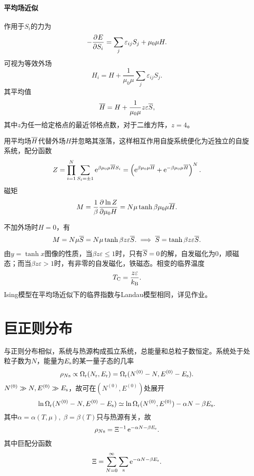 \paragraph{平均场近似}作用于$S_i$的力为 
\[
	-\frac{\partial^{{}}E}{\partial{S_i}^{{}}}=\sum_j\varepsilon_{ij}S_j+\mu_0\mu H.
\]
可视为等效外场
\[
	H_i=H+\frac1{\mu_0\mu}\sum_j\varepsilon_{ij}S_j.
\]
其平均值
\[
	\overline{H}=H+\frac1{\mu_0\mu}z\varepsilon\overline{S},
\]
其中$z$为任一给定格点的最近邻格点数，对于二维方阵，$z=4$。

用平均场$\overline{H}$代替外场$H$并忽略其涨落，这样相互作用自旋系统便化为近独立的自旋系统，配分函数
\[
	Z=\prod_{i=1}^N\sum_{S_i=\pm 1}\mathop{}\!\mathrm{e}^{\beta\mu_0\mu\overline{H} S_i}=\left(\mathop{}\!\mathrm{e}^{\beta\mu_0\mu\overline{H}}+\mathop{}\!\mathrm{e}^{-\beta\mu_0\mu\overline{H}}\right)^N.
\]
磁矩
\begin{align}
	M=\frac1\beta\frac{\partial^{{}}\ln Z}{\partial{\mu_0 H}^{{}}}=N\mu\tanh\beta\mu_0\mu\overline{H}.
\end{align}

不加外场时$H=0$，有
\begin{align}
	M=N\mu\overline{S}=N\mu\tanh\beta z\varepsilon\overline{S}.\implies\overline{S}=\tanh\beta z\varepsilon\overline{S}.
\end{align}
由$y=\tanh x$图像的性质，当$\beta z\varepsilon\leqslant 1$时，只有$\overline{S}=0$的解，自发磁化为0，顺磁态；而当$\beta z\varepsilon>1$时，有非零的自发磁化，铁磁态。相变的临界温度
\begin{align}
	T_\mathrm C=\frac{z\varepsilon}{k_{\mathrm B}}.
\end{align}
Ising模型在平均场近似下的临界指数与Landau模型相同，详见作业。
\section{巨正则分布}

与正则分布相似，系统与热源构成孤立系统，总能量和总粒子数恒定。系统处于处粒子数为$N$，能量为$E_\mathrm s$的某一量子态的几率
\[
	\rho_{N\mathrm s}\propto\Omega_\mathrm r(N_\mathrm r,E_\mathrm r)=\Omega_\mathrm r(N^{(0)}-N,E^{(0)}-E_\mathrm s).
\]
$N^{(0)}\gg N,E^{(0)}\gg E_\mathrm s$，故可在$(N^{(0)},E^{(0)})$处展开
\[
	\ln\Omega_\mathrm r(N^{(0)}-N,E^{(0)}-E_\mathrm s)\simeq\ln\Omega_\mathrm r(N^{(0)},E^{(0)})-\alpha N-\beta E_\mathrm s.
\]
其中$\alpha=\alpha(T,\mu),\;\beta=\beta(T)$只与热源有关，故
\begin{align}
	\rho_{N\mathrm s}=\Xi^{-1}\mathop{}\!\mathrm{e}^{-\alpha N-\beta E_\mathrm s}.
\end{align}
其中巨配分函数
\begin{align}
	\Xi=\sum_{N=0}^\infty\sum_\mathrm s\mathop{}\!\mathrm{e}^{-\alpha N-\beta E_\mathrm s}.
\end{align}
